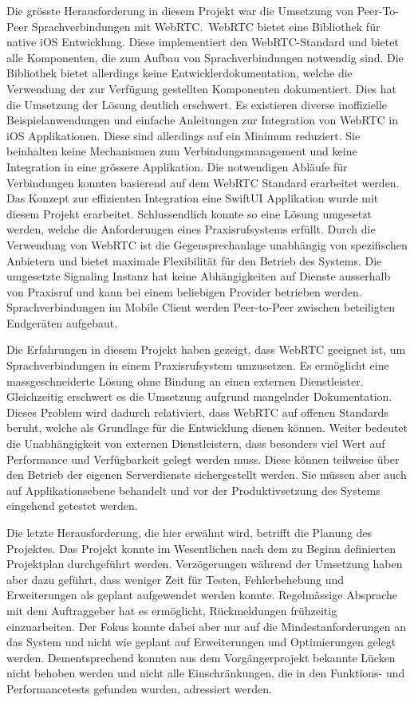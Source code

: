 Die grösste Herausforderung in diesem Projekt war die Umsetzung von Peer-To-Peer Sprachverbindungen mit WebRTC.\
WebRTC bietet eine Bibliothek für native iOS Entwicklung.
Diese implementiert den WebRTC-Standard und bietet alle Komponenten, die zum Aufbau von Sprachverbindungen notwendig sind.
Die Bibliothek bietet allerdings keine Entwicklerdokumentation, welche die Verwendung der zur Verfügung gestellten Komponenten dokumentiert.
Dies hat die Umsetzung der Lösung deutlich erschwert.
Es existieren diverse inoffizielle Beispielanwendungen und einfache Anleitungen zur Integration von WebRTC in iOS Applikationen.
Diese sind allerdings auf ein Minimum reduziert.
Sie beinhalten keine Mechanismen zum Verbindungsmanagement und keine Integration in eine grössere Applikation.
Die notwendigen Abläufe für Verbindungen konnten basierend auf dem WebRTC Standard erarbeitet werden.
Das Konzept zur effizienten Integration eine SwiftUI Applikation wurde mit diesem Projekt erarbeitet.
Schlussendlich konnte so eine Lösung umgesetzt werden, welche die Anforderungen eines Praxisrufsystems erfüllt.
Durch die Verwendung von WebRTC ist die Gegensprechanlage unabhängig von spezifischen Anbietern und bietet maximale Flexibilität für den Betrieb des Systems.
Die umgesetzte Signaling Instanz hat keine Abhängigkeiten auf Dienste ausserhalb von Praxisruf und kann bei einem beliebigen Provider betrieben werden.
Sprachverbindungen im Mobile Client werden Peer-to-Peer zwischen beteiligten Endgeräten aufgebaut.

Die Erfahrungen in diesem Projekt haben gezeigt, dass WebRTC geeignet ist, um Sprachverbindungen in einem Praxisrufsystem umzusetzen.
Es ermöglicht eine massgeschneiderte Lösung ohne Bindung an einen externen Dienstleister.
Gleichzeitig erschwert es die Umsetzung aufgrund mangelnder Dokumentation.
Dieses Problem wird dadurch relativiert, dass WebRTC auf offenen Standards beruht, welche als Grundlage für die Entwicklung dienen können.
Weiter bedeutet die Unabhängigkeit von externen Dienstleistern, dass besonders viel Wert auf Performance und Verfügbarkeit gelegt werden muss.
Diese können teilweise über den Betrieb der eigenen Serverdienste sichergestellt werden.
Sie müssen aber auch auf Applikationsebene behandelt und vor der Produktivsetzung des Systems eingehend getestet werden.

Die letzte Herausforderung, die hier erwähnt wird, betrifft die Planung des Projektes.
Das Projekt konnte im Wesentlichen nach dem zu Beginn definierten Projektplan durchgeführt werden.
Verzögerungen während der Umsetzung haben aber dazu geführt, dass weniger Zeit für Testen, Fehlerbehebung und Erweiterungen als geplant aufgewendet werden konnte.
Regelmässige Absprache mit dem Auftraggeber hat es ermöglicht, Rückmeldungen frühzeitig einzuarbeiten.
Der Fokus konnte dabei aber nur auf die Mindestanforderungen an das System und nicht wie geplant auf Erweiterungen und Optimierungen gelegt werden.
Dementsprechend konnten aus dem Vorgängerprojekt bekannte Lücken nicht behoben werden und nicht alle Einschränkungen, die in den Funktions- und Performancetests gefunden wurden, adressiert werden.

